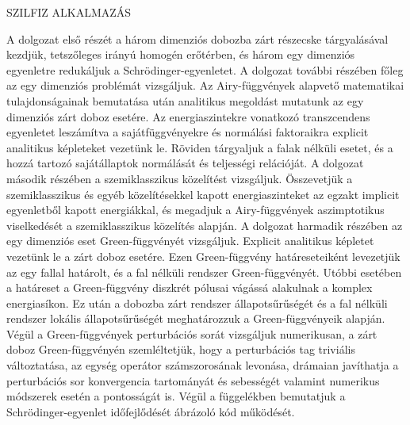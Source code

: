 SZILFIZ ALKALMAZÁS

A dolgozat első részét a három dimenziós dobozba zárt részecske tárgyalásával kezdjük, tetszőleges irányú homogén erőtérben, és három egy dimenziós egyenletre redukáljuk a Schrödinger-egyenletet. A dolgozat további részében főleg az egy dimenziós problémát vizsgáljuk. Az Airy-függvények alapvető matematikai tulajdonságainak bemutatása után analitikus megoldást mutatunk az egy dimenziós zárt doboz esetére. Az energiaszintekre vonatkozó transzcendens egyenletet leszámítva a sajátfüggvényekre és normálási faktoraikra explicit analitikus képleteket vezetünk le. Röviden tárgyaljuk a falak nélküli esetet, és a hozzá tartozó sajátállaptok normálását és teljességi relációját.
A dolgozat második részében a szemiklasszikus közelítést vizsgáljuk. Összevetjük a szemiklasszikus és egyéb közelítésekkel kapott energiaszinteket az egzakt implicit egyenletből kapott energiákkal, és megadjuk a Airy-függvények aszimptotikus viselkedését a szemiklasszikus közelítés alapján.
A dolgozat harmadik részében az egy dimenziós eset Green-függvényét vizsgáljuk. Explicit analitikus képletet vezetünk le a zárt doboz esetére. Ezen Green-függvény határeseteiként levezetjük az egy fallal határolt, és a fal nélküli rendszer Green-függvényét. Utóbbi esetében a határeset a Green-függvény diszkrét pólusai vágássá alakulnak a komplex energiasíkon. Ez után a dobozba zárt rendszer állapotsűrűségét és a fal nélküli rendszer lokális állapotsűrűségét meghatározzuk a Green-függvényeik alapján. Végül a Green-függvények perturbációs sorát vizsgáljuk numerikusan, a zárt doboz Green-függvényén szemléltetjük, hogy a perturbációs tag triviális változtatása, az egység operátor számszorosának levonása, drámaian javíthatja a perturbációs sor konvergencia tartományát és sebességét valamint numerikus módszerek esetén a pontosságát is. Végül a függelékben bemutatjuk a Schrödinger-egyenlet időfejlődését ábrázoló kód működését.